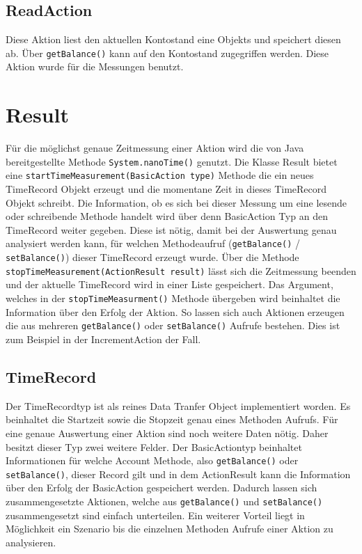 \subsection{ReadAction}
\label{sec:readAction}
Diese Aktion liest den aktuellen Kontostand eine Objekts und speichert diesen ab. Über \verb+getBalance()+ kann auf den Kontostand zugegriffen werden. Diese Aktion wurde für die Messungen benutzt.

\section{Result}
\label{sec:result}
Für die möglichst genaue Zeitmessung einer Aktion wird die von Java bereitgestellte Methode \verb+System.nanoTime()+ genutzt. Die Klasse Result bietet eine \verb+startTimeMeasurement(BasicAction type)+ Methode die ein neues TimeRecord Objekt erzeugt und die momentane Zeit in dieses TimeRecord Objekt schreibt. Die Information, ob es sich bei dieser Messung um eine lesende oder schreibende Methode handelt wird über denn BasicAction Typ an den TimeRecord weiter gegeben. Diese ist nötig, damit bei der Auswertung genau analysiert werden kann, für welchen Methodeaufruf (\verb+getBalance()+ / \verb+setBalance()+) dieser TimeRecord erzeugt wurde. Über die Methode \verb+stopTimeMeasurement(ActionResult result)+ lässt sich die Zeitmessung beenden und der aktuelle TimeRecord wird in einer Liste gespeichert. Das Argument, welches in der \verb+stopTimeMeasurment()+ Methode übergeben wird beinhaltet die Information über den Erfolg der Aktion. So lassen sich auch Aktionen erzeugen die aus mehreren \verb+getBalance()+ oder \verb+setBalance()+ Aufrufe bestehen. Dies ist zum Beispiel in der IncrementAction der Fall.

\subsection{TimeRecord}
\label{sec:timeRecord}
Der TimeRecordtyp ist als reines Data Tranfer Object implementiert worden. Es beinhaltet die Startzeit sowie die Stopzeit genau eines Methoden Aufrufs. Für eine genaue Auswertung einer Aktion sind noch weitere Daten nötig. Daher besitzt dieser Typ zwei weitere Felder. Der BasicActiontyp beinhaltet Informationen für welche Account Methode, also \verb+getBalance()+ oder \verb+setBalance()+, dieser Record gilt und in dem ActionResult kann die Information über den Erfolg der BasicAction gespeichert werden. Dadurch lassen sich zusammengesetzte Aktionen, welche aus \verb+getBalance()+ und \verb+setBalance()+ zusammengesetzt sind einfach unterteilen. Ein weiterer Vorteil liegt in Mög\-lich\-keit ein Sze\-na\-rio bis die ein\-zel\-nen Me\-tho\-den Auf\-rufe einer Aktion zu analysieren. 

